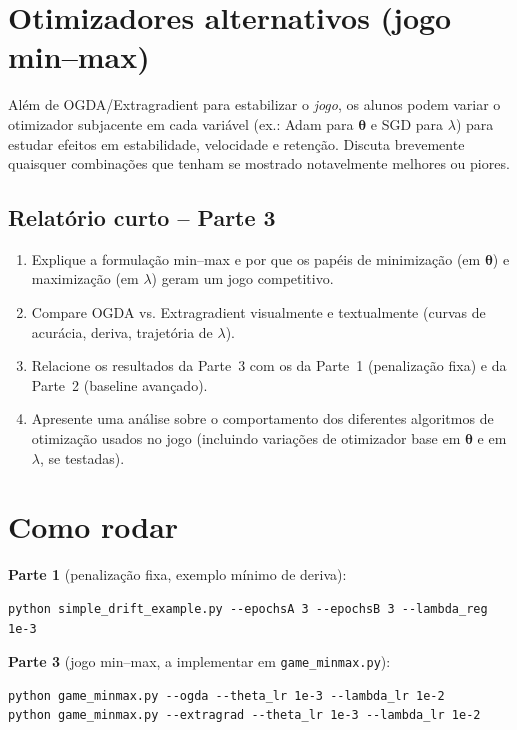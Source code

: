 \documentclass[9pt,a4paper]{extarticle}
\begin{document}
\section*{Otimizadores alternativos (jogo min--max)}
Além de OGDA/Extragradient para estabilizar o \emph{jogo}, os alunos podem variar o otimizador subjacente em cada variável (ex.: Adam para $\bm{\theta}$ e SGD para $\lambda$) para estudar efeitos em estabilidade, velocidade e retenção. Discuta brevemente quaisquer combinações que tenham se mostrado notavelmente melhores ou piores.

\subsection*{Relatório curto -- Parte 3}
\begin{enumerate}
    \item Explique a formulação min--max e por que os papéis de minimização (em $\bm{\theta}$) e maximização (em $\lambda$) geram um jogo competitivo.
    \item Compare OGDA vs. Extragradient visualmente e textualmente (curvas de acurácia, deriva, trajetória de $\lambda$).
    \item Relacione os resultados da Parte~3 com os da Parte~1 (penalização fixa) e da Parte~2 (baseline avançado).
    \item Apresente uma análise sobre o comportamento dos diferentes algoritmos de otimização usados no jogo (incluindo variações de otimizador base em $\bm{\theta}$ e em $\lambda$, se testadas).
\end{enumerate}

\section*{Como rodar}
\textbf{Parte 1} (penalização fixa, exemplo mínimo de deriva):
\begin{verbatim}
python simple_drift_example.py --epochsA 3 --epochsB 3 --lambda_reg 1e-3
\end{verbatim}

\textbf{Parte 3} (jogo min--max, a implementar em \texttt{game\_minmax.py}):

\begin{verbatim}
python game_minmax.py --ogda --theta_lr 1e-3 --lambda_lr 1e-2
python game_minmax.py --extragrad --theta_lr 1e-3 --lambda_lr 1e-2
\end{verbatim}
\end{document}
